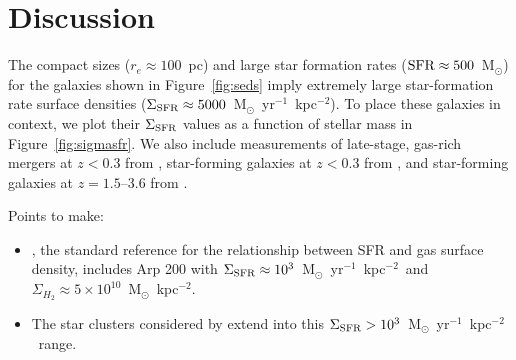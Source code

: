 \documentclass[apj]{emulateapj}
\newcommand{\msun}{M$_{\odot}$}
\newcommand{\units}{M$_{\odot}$~yr$^{-1}$~kpc$^{-2}$}
\newcommand{\sigmasfr}{\Sigma_{\textnormal{\scriptsize{SFR}}}}
\begin{document}
% 
% 
% 
% 
% 






\section{Discussion}

The compact sizes ($r_e\approx100$~pc) and large star formation rates
($\textnormal{SFR}\approx500$~\msun) for the galaxies shown in
Figure~\ref{fig:seds} imply extremely large star-formation rate
surface densities ($\sigmasfr\approx5000$~\units).  To place these
galaxies in context, we plot their $\sigmasfr$ values as a function of
stellar mass in Figure~\ref{fig:sigmasfr}.  We also include
measurements of late-stage, gas-rich mergers at $z<0.3$ from
\citet{vei06}, star-forming galaxies at $z<0.3$ from \citet{ove09},
and star-forming galaxies at $z=1.5$--3.6 from \citet{law12}.

Points to make:
\begin{itemize}
\item \citet{ken98}, the standard reference for the relationship
  between SFR and gas surface density, includes Arp 200 with
  $\sigmasfr\approx10^3$~\units\ and
  $\Sigma_{H_2}\approx5\times10^{10}$~\msun~kpc$^{-2}$.  
\item The star clusters considered by \citet{meu97} extend into this
  $\sigmasfr>10^{3}$~\units\ range.

\end{itemize}
\end{document}
